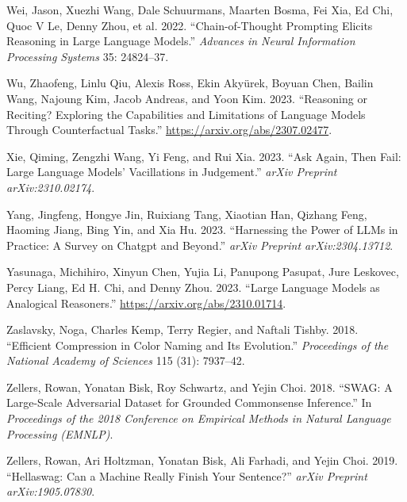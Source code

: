 \documentclass[
]{article}
\newlength{\cslhangindent}
\newenvironment{CSLReferences}[2] %
 {\begin{list}{}{%
  \setlength{\itemindent}{0pt}
  \setlength{\leftmargin}{0pt}
  \setlength{\parsep}{0pt}
  \ifodd #1
   \setlength{\leftmargin}{\cslhangindent}
   \setlength{\itemindent}{-1\cslhangindent}
  \fi
  \setlength{\itemsep}{#2\baselineskip}}}
 {\end{list}}
\begin{document}
\begin{CSLReferences}{1}{0}
Wei, Jason, Xuezhi Wang, Dale Schuurmans, Maarten Bosma, Fei Xia, Ed
Chi, Quoc V Le, Denny Zhou, et al. 2022. {``Chain-of-Thought Prompting
Elicits Reasoning in Large Language Models.''} \emph{Advances in Neural
Information Processing Systems} 35: 24824--37.

Wu, Zhaofeng, Linlu Qiu, Alexis Ross, Ekin Akyürek, Boyuan Chen, Bailin
Wang, Najoung Kim, Jacob Andreas, and Yoon Kim. 2023. {``Reasoning or
Reciting? Exploring the Capabilities and Limitations of Language Models
Through Counterfactual Tasks.''} \url{https://arxiv.org/abs/2307.02477}.

Xie, Qiming, Zengzhi Wang, Yi Feng, and Rui Xia. 2023. {``Ask Again,
Then Fail: Large Language Models' Vacillations in Judgement.''}
\emph{arXiv Preprint arXiv:2310.02174}.

Yang, Jingfeng, Hongye Jin, Ruixiang Tang, Xiaotian Han, Qizhang Feng,
Haoming Jiang, Bing Yin, and Xia Hu. 2023. {``Harnessing the Power of
LLMs in Practice: A Survey on Chatgpt and Beyond.''} \emph{arXiv
Preprint arXiv:2304.13712}.

Yasunaga, Michihiro, Xinyun Chen, Yujia Li, Panupong Pasupat, Jure
Leskovec, Percy Liang, Ed H. Chi, and Denny Zhou. 2023. {``Large
Language Models as Analogical Reasoners.''}
\url{https://arxiv.org/abs/2310.01714}.

Zaslavsky, Noga, Charles Kemp, Terry Regier, and Naftali Tishby. 2018.
{``Efficient Compression in Color Naming and Its Evolution.''}
\emph{Proceedings of the National Academy of Sciences} 115 (31):
7937--42.

Zellers, Rowan, Yonatan Bisk, Roy Schwartz, and Yejin Choi. 2018.
{``SWAG: A Large-Scale Adversarial Dataset for Grounded Commonsense
Inference.''} In \emph{Proceedings of the 2018 Conference on Empirical
Methods in Natural Language Processing (EMNLP)}.

Zellers, Rowan, Ari Holtzman, Yonatan Bisk, Ali Farhadi, and Yejin Choi.
2019. {``Hellaswag: Can a Machine Really Finish Your Sentence?''}
\emph{arXiv Preprint arXiv:1905.07830}.

\end{CSLReferences}
\end{document}
